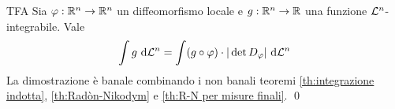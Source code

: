 \documentclass{article}
\begin{document}
\begin{theorem}{TFA}{}
    Sia $\varphi : \mathbb{R}^n \to \mathbb{R}^n$ un diffeomorfismo locale e $g : \mathbb{R}^n \to \mathbb{R}$ una funzione $\mathcal{L}^n$-integrabile. Vale
    \[\intop g \de \L^n = \int (g \circ \varphi)\cdot |\det D_\varphi|\de \L^n\]
    \proof
    La dimostrazione è banale combinando i non banali teoremi \ref{th:integrazione indotta}, \ref{th:Radòn-Nikodym} e \ref{th:R-N per misure finali}.
    \qed
\end{theorem}

\printbibliography
\end{document}
